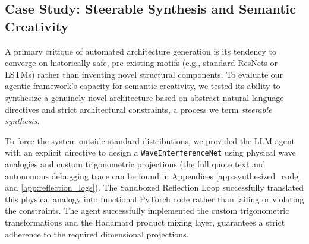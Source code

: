 \documentclass{article}
\begin{document}
\begin{table}[H]
\centering
\caption{End-to-End Search Cost and Inference Efficiency. Comparison of GPU tuning time (5 Optuna trials) and inference latency between baselines, foundation models, and the agent-synthesized WaveInterferenceNet.}
\label{tab:search_cost_summary}
\end{table}

\subsection{Case Study: Steerable Synthesis and Semantic Creativity}
\label{subsec:case}

A primary critique of automated architecture generation is its tendency to converge on historically safe, pre-existing motifs (e.g., standard ResNets or LSTMs) rather than inventing novel structural components. To evaluate our agentic framework's capacity for semantic creativity, we tested its ability to synthesize a genuinely novel architecture based on abstract natural language directives and strict architectural constraints, a process we term \textit{steerable synthesis}.

To force the system outside standard distributions, we provided the LLM agent with an explicit directive to design a \texttt{WaveInterferenceNet} using physical wave analogies and custom trigonometric projections (the full quote text and autonomous debugging trace can be found in Appendices \ref{app:synthesized_code} and \ref{app:reflection_logs}). The Sandboxed Reflection Loop successfully translated this physical analogy into functional PyTorch code rather than failing or violating the constraints. The agent successfully implemented the custom trigonometric transformations and the Hadamard product mixing layer, guarantees a strict adherence to the required dimensional projections.
\end{document}
